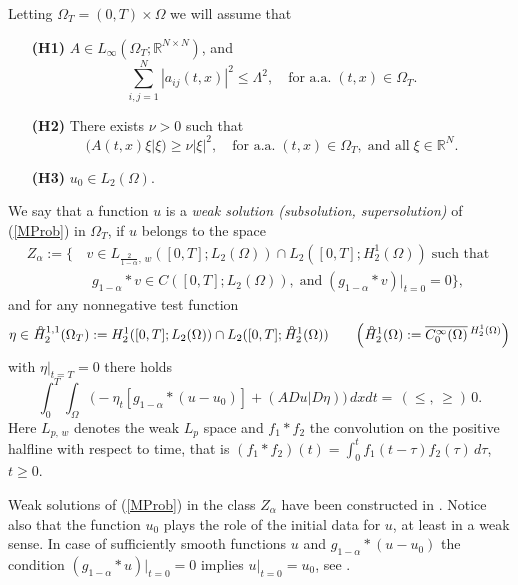 \documentclass[10pt]{article}
\newcommand{\iR}{\mathbb{R}}
\newcommand{\oH}{\hspace*{0.39em}\raisebox{0.6ex}{\textdegree}\hspace{-0.72em}H}
\begin{document}
Letting $\Omega_T=(0,T)\times \Omega$ we will assume that
\begin{itemize}
\item [{\bf (H1)}] $A\in L_\infty(\Omega_T;\iR^{N\times
N})$, and
\[
\sum_{i,j=1}^N|a_{ij}(t,x)|^2\le \Lambda^2,\quad \mbox{for
a.a.}\;(t,x)\in \Omega_T.
\]
\item [{\bf (H2)}] There exists $\nu>0$ such that
\[
\big(A(t,x)\xi|\xi\big)\ge \nu|\xi|^2,\quad\mbox{for a.a.}\;
(t,x)\in\Omega_T,\; \mbox{and all}\;\xi\in \iR^N.
\]
\item [{\bf (H3)}] $u_0\in L_2(\Omega)$.
\end{itemize}
We say that a function $u$ is a {\em weak solution (subsolution,
supersolution)} of (\ref{MProb}) in $\Omega_T$, if $u$ belongs to
the space
\begin{align*}
Z_\alpha:=\{&\,v\in
L_{\frac{2}{1-\alpha},\,w}([0,T];L_2(\Omega))\cap
L_2([0,T];H^1_2(\Omega))\;
\mbox{such that}\;\\
&\;\;g_{1-\alpha}\ast v\in C([0,T];L_2(\Omega)),
\;\mbox{and}\;(g_{1-\alpha}\ast v)|_{t=0}=0\},
\end{align*}
and for any nonnegative test function
\[
\eta\in \oH^{1,1}_2(\Omega_T):=H^1_2([0,T];L_2(\Omega))\cap
L_2([0,T];\oH^1_2(\Omega)) \quad\quad
\Big(\oH^1_2(\Omega):=\overline{C_0^\infty(\Omega)}\,{}^{H^1_2(\Omega)}\Big)
\]
with $\eta|_{t=T}=0$ there holds
\begin{equation} \label{BWF}
\int_{0}^{T} \int_\Omega \Big(-\eta_t [g_{1-\alpha}\ast (u-u_0)]+
(ADu|D \eta)\Big)\,dxdt= \,(\le,\,\ge )\,0.
\end{equation}
Here $L_{p,\,w}$ denotes the weak $L_p$ space and $f_1\ast f_2$ the
convolution on the positive halfline with respect to time, that is
$(f_1\ast f_2)(t)=\int_0^t f_1(t-\tau)f_2(\tau)\,d\tau$, $t\ge 0$.

Weak solutions of (\ref{MProb}) in the class $Z_\alpha$ have been
constructed in \cite{ZWH}. Notice also that the function $u_0$ plays
the role of the initial data for $u$, at least in a weak sense. In
case of sufficiently smooth functions $u$ and
$g_{1-\alpha}\ast(u-u_0)$ the condition $(g_{1-\alpha}\ast
u)|_{t=0}=0$ implies $u|_{t=0}=u_0$, see \cite{ZWH}.
\end{document}
